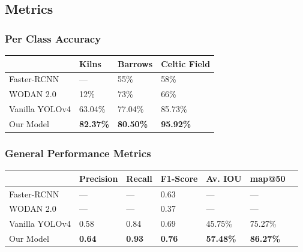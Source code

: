 \documentclass[aspectratio=169]{beamer}
\begin{document}
\subsection{Metrics}
\begin{frame}
	\frametitle{Per Class Accuracy}
	\begin{table}[h]
		\centering
		\begin{tabular}{@{}llll@{}}
			\toprule
				      & Kilns           & Barrows         & Celtic Field    \\ \midrule
				      Faster-RCNN\cite{wouter2019}& ---             & 55\%             & 58\%             \\
				      WODAN 2.0\cite{verschoofAl2020}& 12\% & 73\%             & 66\%             \\
				      Vanilla YOLOv4                & 63.04\%          & 77.04\%          & 85.73\%          \\
				      Our Model & \textbf{82.37\%} & \textbf{80.50\%} & \textbf{95.92\%} \\ \bottomrule
		\end{tabular}
				      \label{tab:resClasses}
	\end{table}
\end{frame}

\begin{frame}
	\frametitle{General Performance Metrics}
	\begin{table}[h]
		\centering
		\begin{tabular}{@{}lllllll@{}}
			\toprule
				      & Precision     & Recall        & F1-Score      & Av. IOU    & map@50         \\ \midrule
				      Faster-RCNN\cite{wouter2019} & ---           & ---           & 0.63          & ---            & ---            \\
				      WODAN 2.0\cite{verschoofAl2020} & ---           & ---           & 0.37 & ---            & ---            \\
				      Vanilla YOLOv4                & 0.58          & 0.84          & 0.69          & 45.75\%          & 75.27\%          \\
				      Our Model  & \textbf{0.64} & \textbf{0.93} & \textbf{0.76} & \textbf{57.48\%} & \textbf{86.27\%} \\ \bottomrule
		\end{tabular}
	\end{table}
\end{frame}
\end{document}
